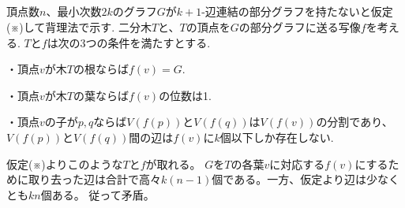 \subsection{}
頂点数$n$、最小次数$2k$のグラフ$G$が$k+1$-辺連結の部分グラフを持たないと仮定(※)して背理法で示す.
二分木$T$と、$T$の頂点を$G$の部分グラフに送る写像$f$を考える.
$T$と$f$は次の3つの条件を満たすとする.

・頂点$v$が木$T$の根ならば$f(v)=G$.

・頂点$v$が木$T$の葉ならば$f(v)$の位数は1.

・頂点$v$の子が$p,q$ならば$V(f(p))$と$V(f(q))$は$V(f(v))$の分割であり、$V(f(p))$と$V(f(q))$間の辺は$f(v)$に$k$個以下しか存在しない.

仮定(※)よりこのような$T$と$f$が取れる。
$G$を$T$の各葉$v$に対応する$f(v)$にするために取り去った辺は合計で高々$k(n-1)$個である。一方、仮定より辺は少なくとも$kn$個ある。
従って矛盾。
